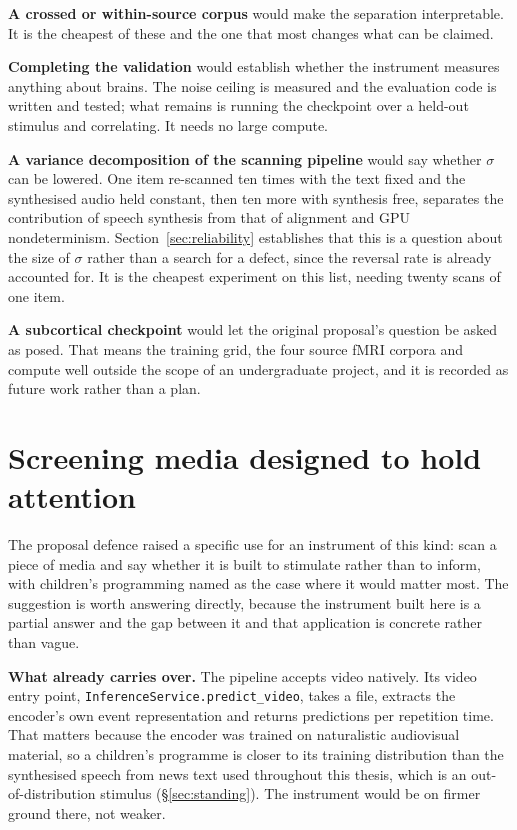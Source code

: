 \textbf{A crossed or within-source corpus} would make the separation interpretable. It is the
cheapest of these and the one that most changes what can be claimed.

\textbf{Completing the validation} would establish whether the instrument measures anything
about brains. The noise ceiling is measured and the evaluation code is written and tested;
what remains is running the checkpoint over a held-out stimulus and correlating. It needs no
large compute.

\textbf{A variance decomposition of the scanning pipeline} would say whether $\sigma$ can be
lowered. One item re-scanned ten times with the text fixed and the synthesised audio held
constant, then ten more with synthesis free, separates the contribution of speech synthesis
from that of alignment and GPU nondeterminism. Section~\ref{sec:reliability} establishes that
this is a question about the size of $\sigma$ rather than a search for a defect, since the
reversal rate is already accounted for. It is the cheapest experiment on this list, needing
twenty scans of one item.

\textbf{A subcortical checkpoint} would let the original proposal's question be asked as
posed. That means the training grid, the four source fMRI corpora and compute well outside
the scope of an undergraduate project, and it is recorded as future work rather than a plan.

\section{Screening media designed to hold attention}
\label{sec:screening-application}

The proposal defence raised a specific use for an instrument of this kind: scan a piece of
media and say whether it is built to stimulate rather than to inform, with children's
programming named as the case where it would matter most. The suggestion is worth answering
directly, because the instrument built here is a partial answer and the gap between it and
that application is concrete rather than vague.

\textbf{What already carries over.} The pipeline accepts video natively. Its video
entry point, \texttt{InferenceService.predict\_video}, takes a file, extracts the encoder's own event
representation and returns predictions per repetition time. That matters because the encoder
was trained on naturalistic audiovisual material, so a children's programme is closer to its
training distribution than the synthesised speech from news text used throughout this thesis,
which is an out-of-distribution stimulus (\S\ref{sec:standing}). The instrument would be on
firmer ground there, not weaker.

